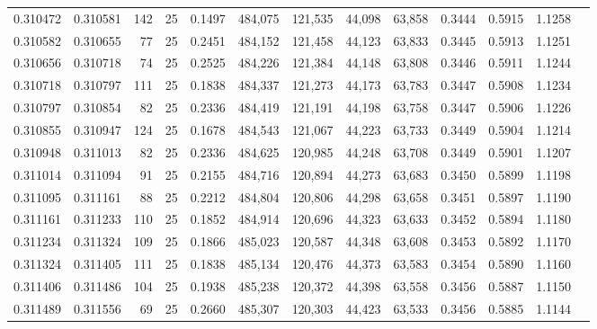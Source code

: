 \begin{tabular}{rrrrrrrrrrrrr}
0.310472 & 0.310581 &   142 &  25 &                                     0.1497 & 484,075 & 121,535 &  44,098 &  63,858 & 0.3444 & 0.5915 & 1.1258 \\
0.310582 & 0.310655 &    77 &  25 &                                     0.2451 & 484,152 & 121,458 &  44,123 &  63,833 & 0.3445 & 0.5913 & 1.1251 \\
0.310656 & 0.310718 &    74 &  25 &                                     0.2525 & 484,226 & 121,384 &  44,148 &  63,808 & 0.3446 & 0.5911 & 1.1244 \\
0.310718 & 0.310797 &   111 &  25 &                                     0.1838 & 484,337 & 121,273 &  44,173 &  63,783 & 0.3447 & 0.5908 & 1.1234 \\
0.310797 & 0.310854 &    82 &  25 &                                     0.2336 & 484,419 & 121,191 &  44,198 &  63,758 & 0.3447 & 0.5906 & 1.1226 \\
0.310855 & 0.310947 &   124 &  25 &                                     0.1678 & 484,543 & 121,067 &  44,223 &  63,733 & 0.3449 & 0.5904 & 1.1214 \\
0.310948 & 0.311013 &    82 &  25 &                                     0.2336 & 484,625 & 120,985 &  44,248 &  63,708 & 0.3449 & 0.5901 & 1.1207 \\
0.311014 & 0.311094 &    91 &  25 &                                     0.2155 & 484,716 & 120,894 &  44,273 &  63,683 & 0.3450 & 0.5899 & 1.1198 \\
0.311095 & 0.311161 &    88 &  25 &                                     0.2212 & 484,804 & 120,806 &  44,298 &  63,658 & 0.3451 & 0.5897 & 1.1190 \\
0.311161 & 0.311233 &   110 &  25 &                                     0.1852 & 484,914 & 120,696 &  44,323 &  63,633 & 0.3452 & 0.5894 & 1.1180 \\
0.311234 & 0.311324 &   109 &  25 &                                     0.1866 & 485,023 & 120,587 &  44,348 &  63,608 & 0.3453 & 0.5892 & 1.1170 \\
0.311324 & 0.311405 &   111 &  25 &                                     0.1838 & 485,134 & 120,476 &  44,373 &  63,583 & 0.3454 & 0.5890 & 1.1160 \\
0.311406 & 0.311486 &   104 &  25 &                                     0.1938 & 485,238 & 120,372 &  44,398 &  63,558 & 0.3456 & 0.5887 & 1.1150 \\
0.311489 & 0.311556 &    69 &  25 &                                     0.2660 & 485,307 & 120,303 &  44,423 &  63,533 & 0.3456 & 0.5885 & 1.1144 \\

\end{tabular}
